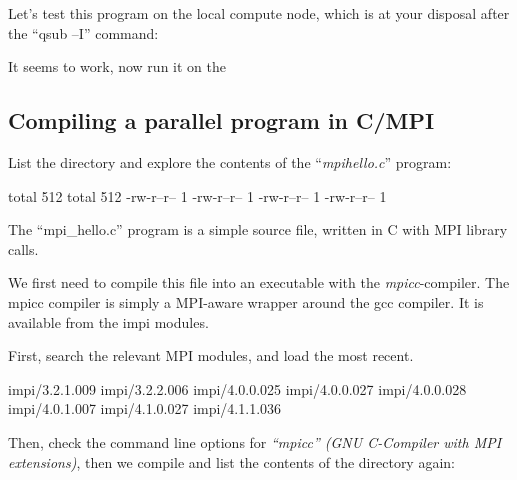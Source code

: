 Let's test this program on the local compute node, which is at your disposal
after the ``qsub --I'' command:



It seems to work, now run it on the \hpc
\begin{prompt}
\end{prompt}

\subsection{Compiling a parallel program in C/MPI}

\begin{prompt}
\end{prompt}

List the directory and explore the contents of the ``\textit{mpihello.c}'' program:
\begin{prompt}
total 512
total 512
-rw-r--r-- 1 %
-rw-r--r-- 1 %
-rw-r--r-- 1 %
-rw-r--r-- 1 %
\end{prompt}


The ``mpi\_hello.c'' program is a simple source file, written in C with MPI library calls.

We first need to compile this file into an executable with the
\emph{mpicc}-compiler. The mpicc compiler is simply a MPI-aware wrapper
around the gcc compiler. It is available from the impi modules.

First, search the relevant MPI modules, and load the most recent.
\begin{prompt}
impi/3.2.1.009
impi/3.2.2.006
impi/4.0.0.025
impi/4.0.0.027
impi/4.0.0.028
impi/4.0.1.007
impi/4.1.0.027
impi/4.1.1.036
\end{prompt}

Then, check the command line options for \emph{``mpicc'' (GNU C-Compiler with
MPI extensions)}, then we compile and list the contents of the directory again:

\begin{prompt}
\end{prompt}

